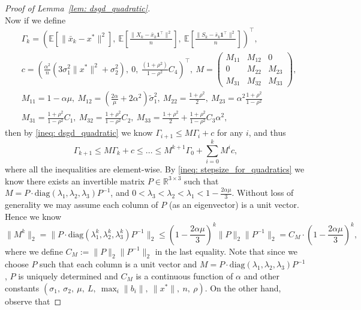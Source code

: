 \documentclass{article}
\theoremstyle{plain}
\theoremstyle{definition}
\theoremstyle{remark}
\newcommand{\R}{\mathbb{R}}
\newcommand{\E}{\mathbb{E}}
\newcommand{\T}{^{\top}}
\newcommand{\bfonet}{\mathbf{1}^{\top}}
\begin{document}
\begin{proof}[Proof of Lemma~\ref{lem: dsgd_quadratic}]
\begin{equation}
    \end{equation}
    Now if we define
    \begin{align*}
        &\Gamma_k = \left(\E\left[\|\bar{x}_k - x^*\|^2\right],\ \E\left[\frac{\|X_k-\bar{x}_k\bfonet\|^2}{n}\right],\ \E\left[\frac{\|S_k-\bar{s}_k\bfonet\|^2}{n}\right]\right)\T,\ \\
        &c = \left(\frac{\alpha^2}{n}(3\sigma_1^2\|x^*\|^2 + \sigma_2^2),\ 0,\ \frac{(1+\rho^2)}{1-\rho^2}C_4\right)\T,\ M = 
        \begin{pmatrix}
            M_{11} &M_{12} &0 \\
            0 &M_{22} &M_{23} \\
            M_{31} &M_{32} &M_{33}
        \end{pmatrix}, \\
        & M_{11} = 1-\alpha\mu,\ M_{12} = \left(\frac{2\alpha}{\mu} + 2\alpha^2\right)\tilde{\sigma}_1^2,\ M_{22} = \frac{1+\rho^2}{2},\ M_{23} = \alpha^2\frac{1+\rho^2}{1-\rho^2} \\
        &M_{31} = \frac{1+\rho^2}{1-\rho^2}C_1,\ M_{32} = \frac{1+\rho^2}{1-\rho^2}C_2,\ M_{33} = \frac{1+\rho^2}{2} + \frac{1+\rho^2}{1-\rho^2}C_3\alpha^2,
    \end{align*}
    then by \eqref{ineq: dsgd_quadratic} we know $\Gamma_{i+1}\leq M\Gamma_i + c$ for any $i$, and thus 
    \[
        \Gamma_{k+1}\leq M\Gamma_k + c\leq...\leq M^{k+1}\Gamma_0 +\sum_{i=0}^{k}M^ic,
    \]
    where all the inequalities are element-wise. By \eqref{ineq: stepsize_for_quadratics} we know there exists an invertible matrix $P\in \R^{3\times 3}$ such that $M = P\cdot\text{diag}(\lambda_1, \lambda_2, \lambda_3)P^{-1}$, and $0<\lambda_3<\lambda_2<\lambda_1<1-\frac{2\alpha\mu}{3}$. Without loss of generality we may assume each column of $P$ (as an eigenvector) is a unit vector. Hence we know
    \begin{equation}\label{ineq: Mk}
        \|M^k\|_2 = \|P\cdot \text{diag}(\lambda_1^k, \lambda_2^k,\lambda_3^k)P^{-1}\|_2\leq \left(1-\frac{2\alpha\mu}{3}\right)^k\|P\|_2\|P^{-1}\|_2 = C_M\cdot \left(1-\frac{2\alpha\mu}{3}\right)^k,
    \end{equation}
    where we define $C_M := \|P\|_2\|P^{-1}\|_2$ in the last equality. Note that since we choose $P$ such that each column is a unit vector and $M = P\cdot\text{diag}(\lambda_1, \lambda_2, \lambda_3)P^{-1}$, $P$ is uniquely determined and $C_M$ is a continuous function of $\alpha$ and other constants $(\sigma_1,\ \sigma_2,\ \mu,\ L,\ \max_{i}\|b_i\|,\ \|x^*\|,\ n,\ \rho)$. On the other hand, observe that 

\end{proof}
\end{document}
